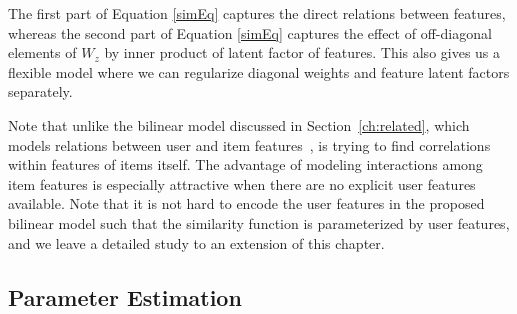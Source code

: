 The first part of Equation \ref{simEq} captures the direct relations between
features, whereas the second part of Equation \ref{simEq} captures the effect of off-diagonal
elements of $W_z$ by inner product of latent factor of features. This also 
gives us a flexible model where we can regularize diagonal weights and feature 
latent factors separately.

Note that unlike the bilinear model discussed in Section~\ref{ch:related}, which
models relations between user and item features~\cite{chu09www},
\CF is trying to find correlations within features of
items itself. The advantage of modeling interactions among item features is
especially attractive when there are no explicit user features available. Note
that it is not hard to encode the user features in the proposed bilinear model
such that the similarity function is parameterized by user features, and we
leave a detailed study to an extension of this chapter.

\subsection{Parameter Estimation}

